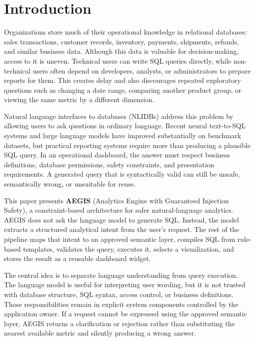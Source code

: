 \documentclass[pdflatex,sn-mathphys-num]{sn-jnl}
\begin{document}
        \section{Introduction}

Organizations store much of their operational knowledge in relational databases: sales transactions, customer records, inventory, payments, shipments, refunds, and similar business data. Although this data is valuable for decision-making, access to it is uneven. Technical users can write SQL queries directly, while non-technical users often depend on developers, analysts, or administrators to prepare reports for them. This creates delay and also discourages repeated exploratory questions such as changing a date range, comparing another product group, or viewing the same metric by a different dimension.


Natural language interfaces to databases (NLIDBs) address this problem by allowing users to ask questions in ordinary language. Recent neural text-to-SQL systems and large language models have improved substantially on benchmark datasets, but practical reporting systems require more than producing a plausible SQL query. In an operational dashboard, the answer must respect business definitions, database permissions, safety constraints, and presentation requirements. A generated query that is syntactically valid can still be unsafe, semantically wrong, or unsuitable for reuse.


This paper presents \textbf{AEGIS} (Analytics Engine with Guaranteed Injection Safety), a constraint-based architecture for safer natural-language analytics. AEGIS does not ask the language model to generate SQL. Instead, the model extracts a structured analytical intent from the user's request. The rest of the pipeline maps that intent to an approved semantic layer, compiles SQL from rule-based templates, validates the query, executes it, selects a visualization, and stores the result as a reusable dashboard widget.


The central idea is to separate language understanding from query execution. The language model is useful for interpreting user wording, but it is not trusted with database structure, SQL syntax, access control, or business definitions. Those responsibilities remain in explicit system components controlled by the application owner. If a request cannot be expressed using the approved semantic layer, AEGIS returns a clarification or rejection rather than substituting the nearest available metric and silently producing a wrong answer.
\end{document}
